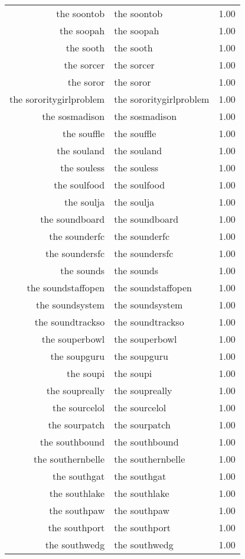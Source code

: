 \begin{table}[ht]
\begin{tabular}{rlr}
  the soontob & the soontob & 1.00 \\ 
  the soopah & the soopah & 1.00 \\ 
  the sooth & the sooth & 1.00 \\ 
  the sorcer & the sorcer & 1.00 \\ 
  the soror & the soror & 1.00 \\ 
  the sororitygirlproblem & the sororitygirlproblem & 1.00 \\ 
  the sosmadison & the sosmadison & 1.00 \\ 
  the souffle & the souffle & 1.00 \\ 
  the souland & the souland & 1.00 \\ 
  the souless & the souless & 1.00 \\ 
  the soulfood & the soulfood & 1.00 \\ 
  the soulja & the soulja & 1.00 \\ 
  the soundboard & the soundboard & 1.00 \\ 
  the sounderfc & the sounderfc & 1.00 \\ 
  the soundersfc & the soundersfc & 1.00 \\ 
  the sounds & the sounds & 1.00 \\ 
  the soundstaffopen & the soundstaffopen & 1.00 \\ 
  the soundsystem & the soundsystem & 1.00 \\ 
  the soundtrackso & the soundtrackso & 1.00 \\ 
  the souperbowl & the souperbowl & 1.00 \\ 
  the soupguru & the soupguru & 1.00 \\ 
  the soupi & the soupi & 1.00 \\ 
  the soupreally & the soupreally & 1.00 \\ 
  the sourcelol & the sourcelol & 1.00 \\ 
  the sourpatch & the sourpatch & 1.00 \\ 
  the southbound & the southbound & 1.00 \\ 
  the southernbelle & the southernbelle & 1.00 \\ 
  the southgat & the southgat & 1.00 \\ 
  the southlake & the southlake & 1.00 \\ 
  the southpaw & the southpaw & 1.00 \\ 
  the southport & the southport & 1.00 \\ 
  the southwedg & the southwedg & 1.00 \\ 

\end{tabular}
\end{table}
